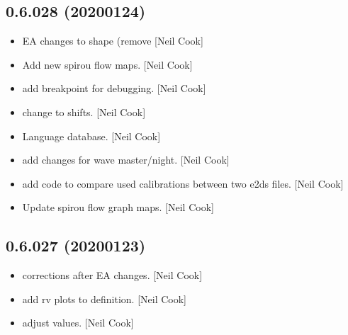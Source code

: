 \documentclass[a4paper,10pt,english]{report}
\begin{document}
\subsection{0.6.028 (2020\sphinxhyphen{}01\sphinxhyphen{}24)}
\label{\detokenize{misc/changelog:id10}}\begin{itemize}
\item {} 
 \sphinxhyphen{} EA changes to shape (remove 
{[}Neil Cook{]}

\item {} 
Add new spirou flow maps. {[}Neil Cook{]}

\item {} 
 \sphinxhyphen{} add breakpoint for
debugging. {[}Neil Cook{]}

\item {} 
 \sphinxhyphen{} change  to shifts.
{[}Neil Cook{]}

\item {} 
Language database. {[}Neil Cook{]}

\item {} 
 \sphinxhyphen{} add changes for wave
master/night. {[}Neil Cook{]}

\item {} 
 \sphinxhyphen{} add code to compare used calibrations
between two e2ds files. {[}Neil Cook{]}

\item {} 
Update spirou flow graph maps. {[}Neil Cook{]}

\end{itemize}


\subsection{0.6.027 (2020\sphinxhyphen{}01\sphinxhyphen{}23)}
\label{\detokenize{misc/changelog:id11}}\begin{itemize}
\item {} 
 \sphinxhyphen{} corrections after EA changes. {[}Neil Cook{]}

\item {} 
 \sphinxhyphen{} add rv plots to
 definition. {[}Neil Cook{]}

\item {} 
 \sphinxhyphen{} adjust 
values. {[}Neil Cook{]}

\end{itemize}
\end{document}
